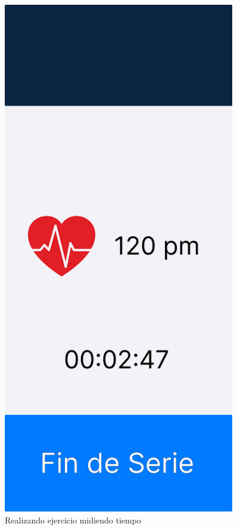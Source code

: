\begin{figure}[H]
   \centering
   \begin{minipage}{0.45\textwidth}
      \centering
      \includegraphics[width=0.9\textwidth]{fotos/Frame 60.png}
      \caption[font=small]{Realizando ejercicio midiendo tiempo}

\end{minipage}
\end{figure}
